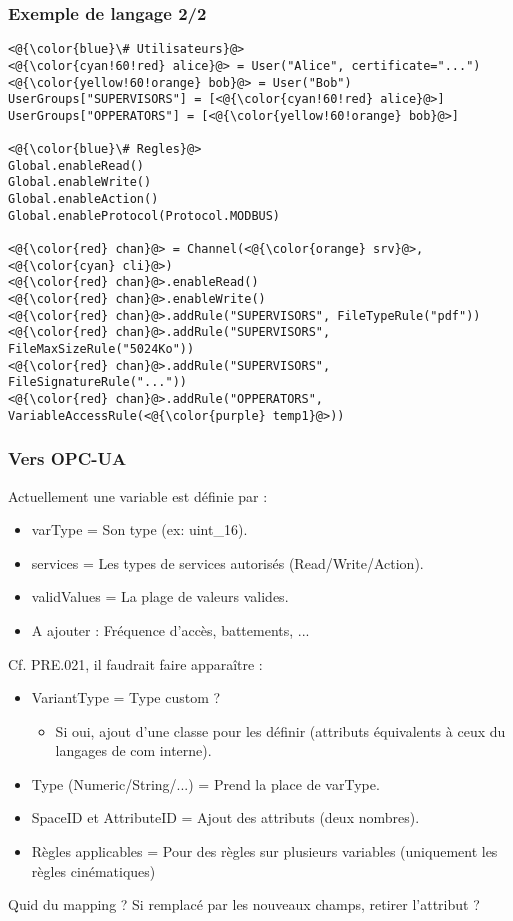 \documentclass{beamer}
\begin{document}
\begin{frame}[fragile]
    \frametitle{Exemple de langage 2/2}

    \begin{lstlisting}
<@{\color{blue}\# Utilisateurs}@>
<@{\color{cyan!60!red} alice}@> = User("Alice", certificate="...")
<@{\color{yellow!60!orange} bob}@> = User("Bob")
UserGroups["SUPERVISORS"] = [<@{\color{cyan!60!red} alice}@>]
UserGroups["OPPERATORS"] = [<@{\color{yellow!60!orange} bob}@>]

<@{\color{blue}\# Regles}@>
Global.enableRead()
Global.enableWrite()
Global.enableAction()
Global.enableProtocol(Protocol.MODBUS)

<@{\color{red} chan}@> = Channel(<@{\color{orange} srv}@>, <@{\color{cyan} cli}@>)
<@{\color{red} chan}@>.enableRead()
<@{\color{red} chan}@>.enableWrite()
<@{\color{red} chan}@>.addRule("SUPERVISORS", FileTypeRule("pdf"))
<@{\color{red} chan}@>.addRule("SUPERVISORS", FileMaxSizeRule("5024Ko"))
<@{\color{red} chan}@>.addRule("SUPERVISORS", FileSignatureRule("..."))
<@{\color{red} chan}@>.addRule("OPPERATORS",  VariableAccessRule(<@{\color{purple} temp1}@>))
    \end{lstlisting}
\end{frame}

\begin{frame}[fragile]
    \frametitle{Vers OPC-UA}

    Actuellement une variable est définie par :
    \begin{itemize}
        \item varType = Son type (ex: uint\_16).
        \item services = Les types de services autorisés (Read/Write/Action).
        \item validValues = La plage de valeurs valides.
        \item A ajouter : Fréquence d'accès, battements, ...
    \end{itemize}
    \vfill
    Cf. PRE.021, il faudrait faire apparaître :
    \begin{itemize}
        \item VariantType = Type custom ?
        \begin{itemize}
            \item Si oui, ajout d'une classe pour les définir (attributs équivalents à ceux du langages de com interne).
        \end{itemize}
        \item Type (Numeric/String/...) = Prend la place de varType.
        \item SpaceID et AttributeID = Ajout des attributs (deux nombres).
        \item Règles applicables = Pour des règles sur plusieurs variables (uniquement les règles cinématiques)
    \end{itemize}
    Quid du mapping ? Si remplacé par les nouveaux champs, retirer l'attribut ?
\end{frame}
\end{document}
